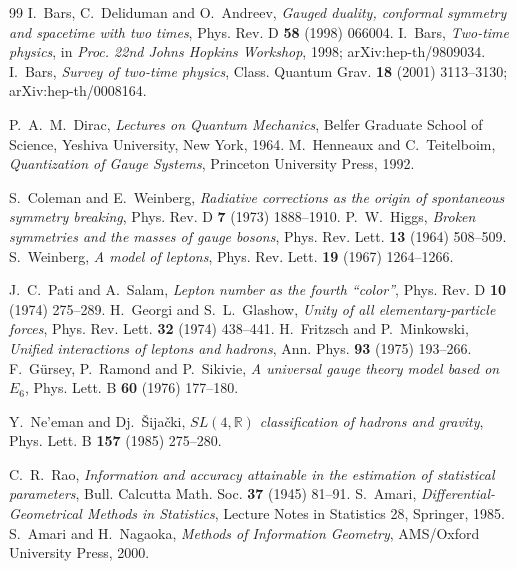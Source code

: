 \documentclass[11pt,oneside]{book}
\newcommand{\RR}{\mathbb{R}}
\theoremstyle{plain}
\theoremstyle{definition}
\theoremstyle{remark}
\begin{document}
\begin{thebibliography}{99}
 I.~Bars, C.~Deliduman and O.~Andreev, \emph{Gauged duality,
conformal symmetry and spacetime with two times}, Phys. Rev. D \textbf{58} (1998)
066004.
 I.~Bars, \emph{Two-time physics}, in \emph{Proc. 22nd Johns
Hopkins Workshop}, 1998; arXiv:hep-th/9809034.
 I.~Bars, \emph{Survey of two-time physics}, Class. Quantum
Grav. \textbf{18} (2001) 3113--3130; arXiv:hep-th/0008164.

 P.~A.~M.~Dirac, \emph{Lectures on Quantum Mechanics},
Belfer Graduate School of Science, Yeshiva University, New York, 1964.
 M.~Henneaux and C.~Teitelboim, \emph{Quantization
of Gauge Systems}, Princeton University Press, 1992.

 S.~Coleman and E.~Weinberg, \emph{Radiative
corrections as the origin of spontaneous symmetry breaking}, Phys. Rev. D
\textbf{7} (1973) 1888--1910.
 P.~W.~Higgs, \emph{Broken symmetries and the masses of gauge
bosons}, Phys. Rev. Lett. \textbf{13} (1964) 508--509.
 S.~Weinberg, \emph{A model of leptons}, Phys. Rev. Lett.
\textbf{19} (1967) 1264--1266.

 J.~C.~Pati and A.~Salam, \emph{Lepton number as the fourth
``color''}, Phys. Rev. D \textbf{10} (1974) 275--289.
 H.~Georgi and S.~L.~Glashow, \emph{Unity of all
elementary-particle forces}, Phys. Rev. Lett. \textbf{32} (1974) 438--441.
 H.~Fritzsch and P.~Minkowski, \emph{Unified
interactions of leptons and hadrons}, Ann. Phys. \textbf{93} (1975) 193--266.
 F.~G\"ursey, P.~Ramond and P.~Sikivie, \emph{A
universal gauge theory model based on $E_6$}, Phys. Lett. B \textbf{60} (1976)
177--180.

 Y.~Ne'eman and Dj.~\v{S}ija\v{c}ki, \emph{$SL(4,\RR)$
classification of hadrons and gravity}, Phys. Lett. B \textbf{157} (1985)
275--280.

 C.~R.~Rao, \emph{Information and accuracy attainable in the
estimation of statistical parameters}, Bull. Calcutta Math. Soc. \textbf{37}
(1945) 81--91.
 S.~Amari, \emph{Differential-Geometrical Methods in
Statistics}, Lecture Notes in Statistics 28, Springer, 1985.
 S.~Amari and H.~Nagaoka, \emph{Methods of Information
Geometry}, AMS/Oxford University Press, 2000.


\end{thebibliography}
\end{document}
